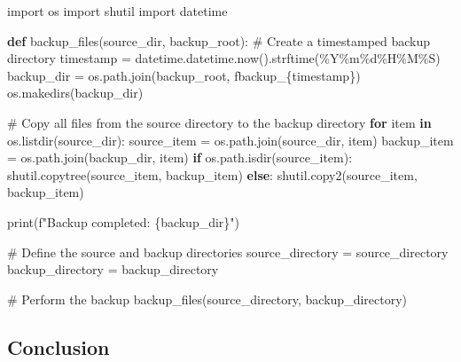\documentclass[
  letterpaper,
  DIV=11,
  numbers=noendperiod]{scrreprt}
\newenvironment{Shaded}{\begin{snugshade}}{\end{snugshade}}
\newcommand{\BuiltInTok}[1]{\textcolor[rgb]{0.00,0.23,0.31}{#1}}
\newcommand{\CommentTok}[1]{\textcolor[rgb]{0.37,0.37,0.37}{#1}}
\newcommand{\ControlFlowTok}[1]{\textcolor[rgb]{0.00,0.23,0.31}{\textbf{#1}}}
\newcommand{\ImportTok}[1]{\textcolor[rgb]{0.00,0.46,0.62}{#1}}
\newcommand{\KeywordTok}[1]{\textcolor[rgb]{0.00,0.23,0.31}{\textbf{#1}}}
\newcommand{\NormalTok}[1]{\textcolor[rgb]{0.00,0.23,0.31}{#1}}
\newcommand{\OperatorTok}[1]{\textcolor[rgb]{0.37,0.37,0.37}{#1}}
\newcommand{\SpecialCharTok}[1]{\textcolor[rgb]{0.37,0.37,0.37}{#1}}
\newcommand{\SpecialStringTok}[1]{\textcolor[rgb]{0.13,0.47,0.30}{#1}}
\newcommand{\StringTok}[1]{\textcolor[rgb]{0.13,0.47,0.30}{#1}}
\begin{document}
\begin{Shaded}
\begin{Highlighting}[]
\ImportTok{import}\NormalTok{ os}
\ImportTok{import}\NormalTok{ shutil}
\ImportTok{import}\NormalTok{ datetime}

\KeywordTok{def}\NormalTok{ backup\_files(source\_dir, backup\_root):}
    \CommentTok{\# Create a timestamped backup directory}
\NormalTok{    timestamp }\OperatorTok{=}\NormalTok{ datetime.datetime.now().strftime(}\StringTok{\textquotesingle{}\%Y\%m}\SpecialCharTok{\%d}\StringTok{\%H\%M\%S\textquotesingle{}}\NormalTok{)}
\NormalTok{    backup\_dir }\OperatorTok{=}\NormalTok{ os.path.join(backup\_root, }\SpecialStringTok{f\textquotesingle{}backup\_}\SpecialCharTok{\{}\NormalTok{timestamp}\SpecialCharTok{\}}\SpecialStringTok{\textquotesingle{}}\NormalTok{)}
\NormalTok{    os.makedirs(backup\_dir)}
    
    \CommentTok{\# Copy all files from the source directory to the backup directory}
    \ControlFlowTok{for}\NormalTok{ item }\KeywordTok{in}\NormalTok{ os.listdir(source\_dir):}
\NormalTok{        source\_item }\OperatorTok{=}\NormalTok{ os.path.join(source\_dir, item)}
\NormalTok{        backup\_item }\OperatorTok{=}\NormalTok{ os.path.join(backup\_dir, item)}
        \ControlFlowTok{if}\NormalTok{ os.path.isdir(source\_item):}
\NormalTok{            shutil.copytree(source\_item, backup\_item)}
        \ControlFlowTok{else}\NormalTok{:}
\NormalTok{            shutil.copy2(source\_item, backup\_item)}
    
    \BuiltInTok{print}\NormalTok{(}\SpecialStringTok{f"Backup completed: }\SpecialCharTok{\{}\NormalTok{backup\_dir}\SpecialCharTok{\}}\SpecialStringTok{"}\NormalTok{)}

\CommentTok{\# Define the source and backup directories}
\NormalTok{source\_directory }\OperatorTok{=} \StringTok{\textquotesingle{}source\_directory\textquotesingle{}}
\NormalTok{backup\_directory }\OperatorTok{=} \StringTok{\textquotesingle{}backup\_directory\textquotesingle{}}

\CommentTok{\# Perform the backup}
\NormalTok{backup\_files(source\_directory, backup\_directory)}
\end{Highlighting}
\end{Shaded}

\subsection{Conclusion}\label{conclusion-20}
\end{document}
